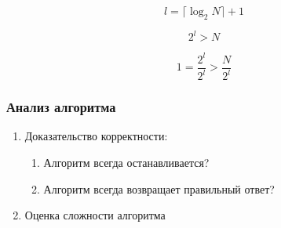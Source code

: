 \documentclass[24pt,pdf,hyperref={unicode},aspectratio=169]{beamer}
\begin{document}
\begin{frame}

$$
l=\lceil \log_2 N \rceil +1
$$

$$
2^l>N
$$

$$
1=\frac{2^l}{2^l}>\frac{N}{2^l}
$$

\end{frame}

\begin{frame}\frametitle{Анализ алгоритма}

\begin{enumerate}
\item Доказательство корректности:
\begin{enumerate}
\item Алгоритм всегда останавливается?
\item Алгоритм всегда возвращает правильный ответ?
\end{enumerate}
\item Оценка сложности алгоритма
\end{enumerate}
\end{frame}
\end{document}
